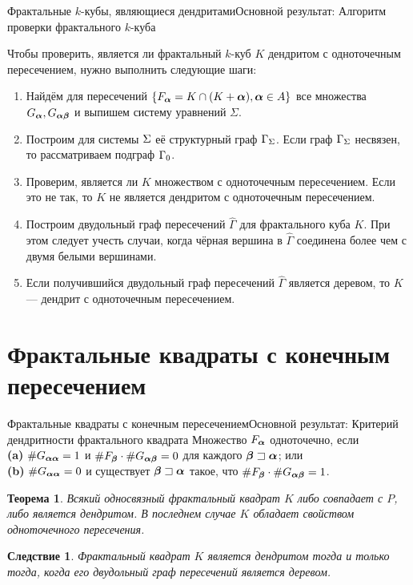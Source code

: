 \documentclass[aspectratio=1610, 10pt, notheorems]{beamer}
\newtheorem{theorem}     {Теорема}
\newtheorem{corollary}   {Следствие}
\begin{document}
\begin{frame}{Фрактальные $k$-кубы, являющиеся дендритами}{Основной результат: Алгоритм проверки фрактального $k$-куба}

Чтобы проверить, является ли фрактальный $k$-куб $K$ дендритом с одноточечным пересечением, нужно выполнить следующие шаги:

\begin{enumerate}

\item  Найдём для пересечений $\{F_{\bm{\alpha}}=K\cap(K+{\bm{\alpha}}), {\bm{\alpha}}\in A\}$ все множества $G_{\bm{\alpha}}, G_{{\bm{\alpha}}{\bm{\beta}}}$ и выпишем систему уравнений $\Sigma$.

\item  Построим для системы $\Sigma$ её структурный граф $\Gamma_\Sigma$.
Если граф $\Gamma_\Sigma$ несвязен, то рассматриваем подграф $\Gamma_0$.
 
\item  Проверим, является ли $K$ множеством с одноточечным пересечением.
Если это не так, то $K$ не является дендритом с одноточечным пересечением.
    
\item  Построим двудольный граф пересечений $\hat\Gamma$ для фрактального куба $K$.
При этом следует учесть случаи, когда чёрная вершина в $\hat\Gamma$ соединена более чем с двумя белыми вершинами.

\item  Если получившийся двудольный граф пересечений $\hat\Gamma$ является деревом, то $K$ --- дендрит с одноточечным пересечением.    
\end{enumerate}
\end{frame}


\section{Фрактальные квадраты с конечным пересечением}


\begin{frame}{Фрактальные квадраты с конечным пересечением}{Основной результат: Критерий дендритности фрактального квадрата}
Множество $F_{\bm{\alpha}}$ одноточечно, если \\
\textbf{(a)} $\#G_{{\bm{\alpha}}{\bm{\alpha}}}=1$ и $\#F_{\bm{\beta}}\cdot\#G_{{\bm{\alpha}}{\bm{\beta}}}=0$ для каждого ${\bm{\beta}}\sqsupset{\bm{\alpha}}$; или\\
\textbf{(b)} $\#G_{{\bm{\alpha}}{\bm{\alpha}}}=0$ и существует ${\bm{\beta}}\sqsupset{\bm{\alpha}}$ такое, что $\#F_{\bm{\beta}}\cdot\#G_{{\bm{\alpha}}{\bm{\beta}}}=1$.
\begin{theorem}
Всякий односвязный фрактальный квадрат $K$ либо совпадает с $P$, либо является дендритом.
В последнем случае $K$ обладает свойством одноточечного пересечения.
\end{theorem}
\begin{corollary}
Фрактальный квадрат $K$ является дендритом тогда и только тогда, когда его двудольный граф пересечений является деревом.
\end{corollary}
\end{frame}
\end{document}
